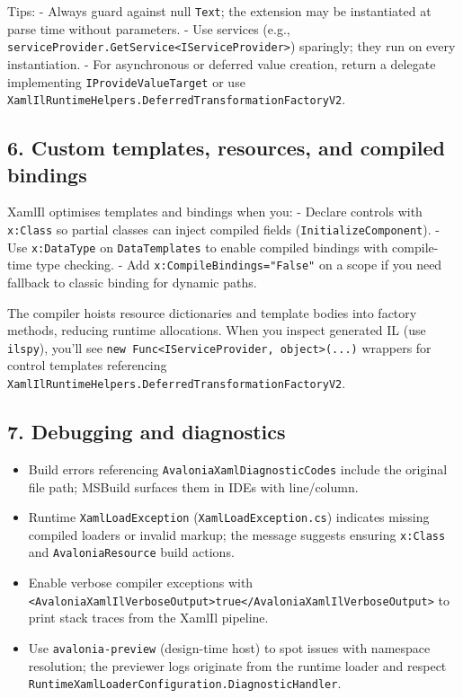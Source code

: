 Tips: - Always guard against null \passthrough{\lstinline!Text!}; the
extension may be instantiated at parse time without parameters. - Use
services (e.g.,
\passthrough{\lstinline!serviceProvider.GetService<IServiceProvider>!})
sparingly; they run on every instantiation. - For asynchronous or
deferred value creation, return a delegate implementing
\passthrough{\lstinline!IProvideValueTarget!} or use
\passthrough{\lstinline!XamlIlRuntimeHelpers.DeferredTransformationFactoryV2!}.

\subsection{6. Custom templates, resources, and compiled
bindings}\label{custom-templates-resources-and-compiled-bindings}

XamlIl optimises templates and bindings when you: - Declare controls
with \passthrough{\lstinline!x:Class!} so partial classes can inject
compiled fields (\passthrough{\lstinline!InitializeComponent!}). - Use
\passthrough{\lstinline!x:DataType!} on
\passthrough{\lstinline!DataTemplates!} to enable compiled bindings with
compile-time type checking. - Add
\passthrough{\lstinline!x:CompileBindings="False"!} on a scope if you
need fallback to classic binding for dynamic paths.

The compiler hoists resource dictionaries and template bodies into
factory methods, reducing runtime allocations. When you inspect
generated IL (use \passthrough{\lstinline!ilspy!}), you'll see
\passthrough{\lstinline!new Func<IServiceProvider, object>(...)!}
wrappers for control templates referencing
\passthrough{\lstinline!XamlIlRuntimeHelpers.DeferredTransformationFactoryV2!}.

\subsection{7. Debugging and
diagnostics}\label{debugging-and-diagnostics-1}

\begin{itemize}
\tightlist
\item
  Build errors referencing
  \passthrough{\lstinline!AvaloniaXamlDiagnosticCodes!} include the
  original file path; MSBuild surfaces them in IDEs with line/column.
\item
  Runtime \passthrough{\lstinline!XamlLoadException!}
  (\passthrough{\lstinline!XamlLoadException.cs!}) indicates missing
  compiled loaders or invalid markup; the message suggests ensuring
  \passthrough{\lstinline!x:Class!} and
  \passthrough{\lstinline!AvaloniaResource!} build actions.
\item
  Enable verbose compiler exceptions with
  \passthrough{\lstinline!<AvaloniaXamlIlVerboseOutput>true</AvaloniaXamlIlVerboseOutput>!}
  to print stack traces from the XamlIl pipeline.
\item
  Use \passthrough{\lstinline!avalonia-preview!} (design-time host) to
  spot issues with namespace resolution; the previewer logs originate
  from the runtime loader and respect
  \passthrough{\lstinline!RuntimeXamlLoaderConfiguration.DiagnosticHandler!}.
\end{itemize}

